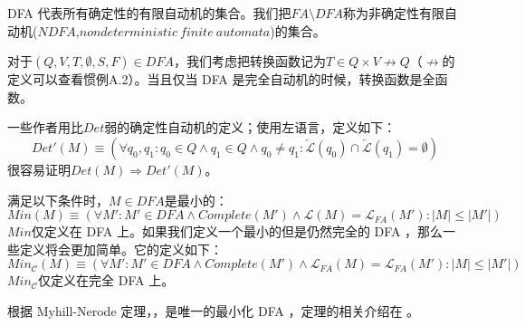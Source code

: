 \begin{definition}[$FA$的确定性]
     DFA 代表所有确定性的有限自动机的集合。我们把$FA \setminus DFA$称为非确定性有限自动机($NDFA$,$nondeterministic\ finite\ automata$)的集合。
\end{definition}

\begin{convention}[DFA的转换函数]
    对于$(Q,V,T,\emptyset,S,F)\in DFA$，我们考虑把转换函数记为$T\in Q \times V \not\rightarrow Q$（$\not\rightarrow$的定义可以查看惯例A.2）。当且仅当  DFA  是完全自动机的时候，转换函数是全函数。
\end{convention}


\begin{property}[弱确定性自动机]
    一些作者用比$Det$弱的确定性自动机的定义；使用左语言，定义如下：
    $$ Det'(M) \equiv (\forall q_0,q_1 : q_0 \in Q \land q_1 \in Q \land q_0 \not= q_1 : \overleftarrow{\mathcal{L}}(q_0) \cap \overleftarrow{\mathcal{L}}(q_1) = \emptyset ) $$
很容易证明$Det(M) \Rightarrow Det'(M)$。
\end{property}

\begin{definition}
    满足以下条件时，$M\in DFA$是最小的：
    $$ Min(M) \equiv (\forall M' : M' \in DFA \land Complete(M') \land \mathcal{L}(M) = \mathcal{L}_{FA}(M') : |M| \leq |M'| ) $$
$Min$仅定义在 DFA 上。如果我们定义一个最小的但是仍然完全的 DFA ，那么一些定义将会更加简单。它的定义如下：
\small{ $$ Min_{\mathcal{C}}(M) \equiv ( \forall M':M' \in DFA \land Complete(M') \land \mathcal{L}_{FA}(M) = \mathcal{L}_{FA}(M'): |M| \leq |M'| ) $$ }
$Min_{\mathcal{C}}$仅定义在完全 DFA 上。
\end{definition}

\begin{definition}
    根据 Myhill-Nerode 定理，，是唯一的最小化 DFA ，定理的相关介绍在 \cite{Wats93}。
\end{definition}

